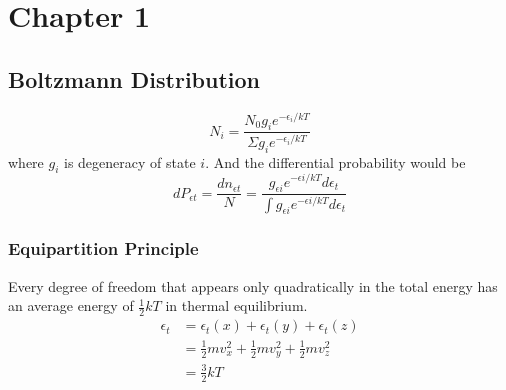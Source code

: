 \documentclass[letterpaper]{article}
\begin{document}
\newpage
\section*{Chapter 1}
\subsection*{Boltzmann Distribution}
\begin{equation*}
    N_i=\frac{N_0 g_i e^{-\epsilon_i/kT}}{\Sigma g_i e^{-\epsilon_i/kT}}
\end{equation*}
where $g_i$ is degeneracy of state $i$.
And the differential probability would be
\begin{equation*}
    dP_{\epsilon t} = \frac{dn_{\epsilon t}}{N} = \frac{g_{\epsilon i} e^{-\epsilon i/kT}
        d\epsilon_t}{\int g_{\epsilon i} e^{-\epsilon i/kT}d\epsilon_t}
\end{equation*}
\subsubsection*{Equipartition Principle}
Every degree of freedom that appears only quadratically in the total energy has an average
energy of $\frac{1}{2}kT$ in thermal equilibrium.
\begin{equation*}
    \begin{aligned}
        \epsilon _t & = \epsilon _t(x) + \epsilon _t(y) + \epsilon _t(z)          \\
                    & = \frac{1}{2}mv_x^2 + \frac{1}{2}mv_y^2 + \frac{1}{2}mv_z^2 \\
                    & = \frac{3}{2}kT
    \end{aligned}
\end{equation*}
\end{document}
